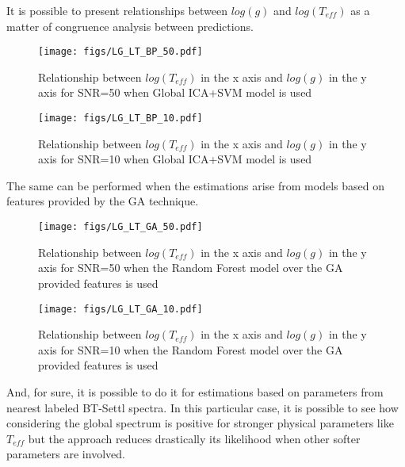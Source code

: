 {
It is possible to present relationships between $log(g)$ and $log(T_{eff})$
as a matter of congruence analysis between predictions.

\begin{figure}
 \begin{center}
 \texttt{[image: figs/LG\_LT\_BP\_50.pdf]}
 \caption{Relationship between $log(T_{eff}) $ in the x axis 
 and $log(g)$ in the y axis for SNR=50 when Global ICA+SVM model
 is used}
 \label{fig:lg_lt_bp_50}
 \end{center}
\end{figure}

\begin{figure} 
 \begin{center}
 \texttt{[image: figs/LG\_LT\_BP\_10.pdf]}
 \caption{Relationship between $log(T_{eff}) $ in the x axis 
 and $log(g)$ in the y axis for SNR=10 when Global ICA+SVM model
 is used}
 \label{fig:lg_lt_bp_50}
 \end{center}
\end{figure}

The same can be performed when the estimations arise from models 
based on features provided by the GA technique.

\begin{figure}
 \begin{center}
 \texttt{[image: figs/LG\_LT\_GA\_50.pdf]}
 \caption{Relationship between $log(T_{eff}) $ in the x axis 
 and $log(g)$ in the y axis for SNR=50 when 
 the Random Forest model over the GA provided features 
 is used}
 \label{fig:lg_lt_ga_50}
 \end{center}
\end{figure}

\begin{figure}
 \begin{center}
 \texttt{[image: figs/LG\_LT\_GA\_10.pdf]}
 \caption{Relationship between $log(T_{eff}) $ in the x axis 
 and $log(g)$ in the y axis for SNR=10 when 
 the Random Forest model over the GA provided features 
 is used}
 \label{fig:lg_lt_ga_10}
 \end{center}
\end{figure}


And, for sure, it is possible to do it for estimations based on 
parameters from nearest labeled BT-Settl spectra.
In this particular case, it is possible to see how 
considering the global spectrum is positive for stronger 
physical parameters like $T_{eff}$ but the approach
reduces drastically its likelihood when other softer 
parameters are involved.

}
